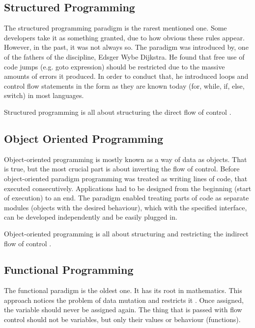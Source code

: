 \subsection{Structured Programming}
\label{subsec:oop}

The structured programming paradigm is the rarest mentioned one. Some developers take it as something granted, due to how obvious these rules appear. However, in the past, it was not always so. 
The paradigm was introduced by, one of the fathers of the discipline, Edsger Wybe Dijkstra. He found that free use of code jumps (e.g. goto expression) should be restricted due to the massive amounts of errors it produced. In order to conduct that, he introduced loops and control flow statements in the form as they are known today (for, while, if, else, switch) in most languages. 

Structured programming is all about structuring the direct flow of control  \cite{cleanArch}. 

\subsection{Object Oriented Programming}
\label{subsec:oop}

Object-oriented programming is mostly known as a way of data as objects. That is true, but the most crucial part is about inverting the flow of control. Before object-oriented paradigm programming was treated as writing lines of code, that executed consecutively. Applications had to be designed from the beginning (start of execution) to an end. The paradigm enabled treating parts of code as separate modules (objects with the desired behaviour), which with the specified interface, can be developed independently and be easily plugged in.

Object-oriented programming is all about structuring and restricting the indirect flow of control \cite{cleanArch}.


\subsection{Functional Programming}
\label{subsec:functionalProgramming}

The functional paradigm is the oldest one. It has its root in mathematics. This approach notices the problem of data mutation and restricts it \cite{cleanArch}. Once assigned, the variable should never be assigned again. The thing that is passed with flow control should not be variables, but only their values or behaviour (functions). 

